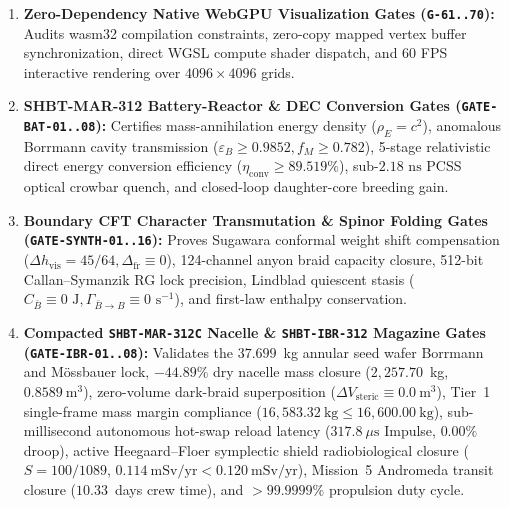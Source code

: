 \documentclass[11pt,onecolumn]{article}
\begin{document}
\begin{enumerate}
    \item \textbf{Zero-Dependency Native WebGPU Visualization Gates (\texttt{G-61..70}):} Audits wasm32 compilation constraints, zero-copy mapped vertex buffer synchronization, direct WGSL compute shader dispatch, and 60 FPS interactive rendering over $4096 \times 4096$ grids.
    \item \textbf{SHBT-MAR-312 Battery-Reactor \& DEC Conversion Gates (\texttt{GATE-BAT-01..08}):} Certifies mass-annihilation energy density ($\rho_E = c^2$), anomalous Borrmann cavity transmission ($\varepsilon_B \ge 0.9852, f_M \ge 0.782$), 5-stage relativistic direct energy conversion efficiency ($\eta_{\mathrm{conv}} \ge 89.519\%$), sub-$2.18\text{ ns}$ PCSS optical crowbar quench, and closed-loop daughter-core breeding gain.
    \item \textbf{Boundary CFT Character Transmutation \& Spinor Folding Gates (\texttt{GATE-SYNTH-01..16}):} Proves Sugawara conformal weight shift compensation ($\Delta h_{\mathrm{vis}} = 45/64, \Delta_{\mathrm{fr}} \equiv 0$), 124-channel anyon braid capacity closure, 512-bit Callan--Symanzik RG lock precision, Lindblad quiescent stasis ($C_{\bar B} \equiv 0\text{ J}, \Gamma_{\bar B \to B} \equiv 0\text{ s}^{-1}$), and first-law enthalpy conservation.
    \item \textbf{Compacted \texttt{SHBT-MAR-312C} Nacelle \& \texttt{SHBT-IBR-312} Magazine Gates (\texttt{GATE-IBR-01..08}):} Validates the $37.699$~kg annular seed wafer Borrmann and M\"{o}ssbauer lock, $-44.89\%$ dry nacelle mass closure ($2{,}257.70$~kg, $0.8589~\mathrm{m}^3$), zero-volume dark-braid superposition ($\Delta V_{\mathrm{steric}} \equiv 0.0~\mathrm{m}^3$), Tier~1 single-frame mass margin compliance ($16{,}583.32~\mathrm{kg} \le 16{,}600.00~\mathrm{kg}$), sub-millisecond autonomous hot-swap reload latency ($317.8~\mu\mathrm{s}$ Impulse, $0.00\%$ droop), active Heegaard--Floer symplectic shield radiobiological closure ($S = 100/1089$, $0.114~\mathrm{mSv/yr} < 0.120~\mathrm{mSv/yr}$), Mission~5 Andromeda transit closure ($10.33$~days crew time), and $>99.9999\%$ propulsion duty cycle.

\end{enumerate}
\end{document}
